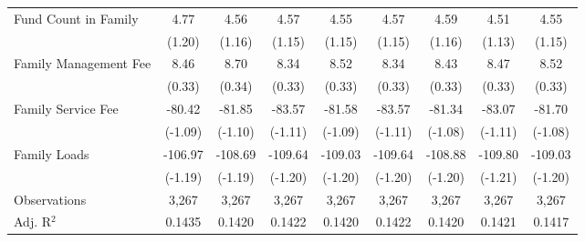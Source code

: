 {\begin{tabular}{l*{8}{c}}
\addlinespace
Fund Count in Family&        4.77         &        4.56         &        4.57         &        4.55         &        4.57         &        4.59         &        4.51         &        4.55         \\
                    &      (1.20)         &      (1.16)         &      (1.15)         &      (1.15)         &      (1.15)         &      (1.16)         &      (1.13)         &      (1.15)         \\
\addlinespace
Family Management Fee&        8.46         &        8.70         &        8.34         &        8.52         &        8.34         &        8.43         &        8.47         &        8.52         \\
                    &      (0.33)         &      (0.34)         &      (0.33)         &      (0.33)         &      (0.33)         &      (0.33)         &      (0.33)         &      (0.33)         \\
\addlinespace
Family Service Fee  &      -80.42         &      -81.85         &      -83.57         &      -81.58         &      -83.57         &      -81.34         &      -83.07         &      -81.70         \\
                    &     (-1.09)         &     (-1.10)         &     (-1.11)         &     (-1.09)         &     (-1.11)         &     (-1.08)         &     (-1.11)         &     (-1.08)         \\
\addlinespace
Family Loads        &     -106.97         &     -108.69         &     -109.64         &     -109.03         &     -109.64         &     -108.88         &     -109.80         &     -109.03         \\
                    &     (-1.19)         &     (-1.19)         &     (-1.20)         &     (-1.20)         &     (-1.20)         &     (-1.20)         &     (-1.21)         &     (-1.20)         \\
\midrule
Observations        &       3,267         &       3,267         &       3,267         &       3,267         &       3,267         &       3,267         &       3,267         &       3,267         \\
Adj. R$^{2}$        &      0.1435         &      0.1420         &      0.1422         &      0.1420         &      0.1422         &      0.1420         &      0.1421         &      0.1417         \\
\bottomrule
\end{tabular}
}

